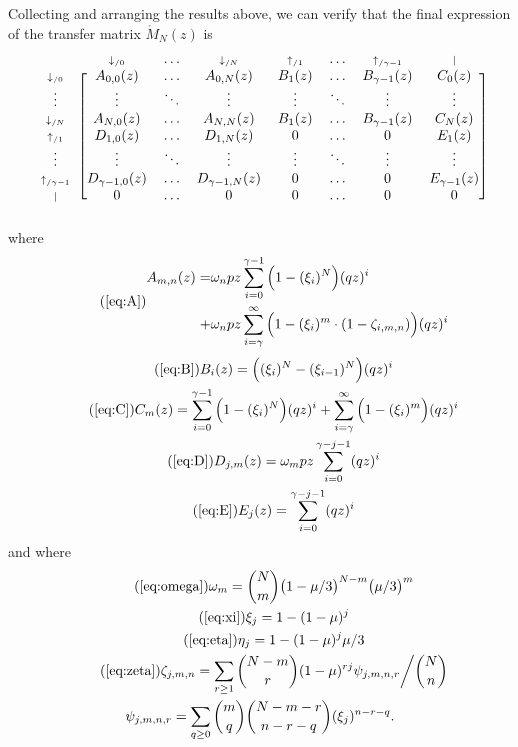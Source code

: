 \documentclass{article}
\newcommand{\dn}[1]{\scriptstyle{\downarrow_{/#1}}}
\newcommand{\up}[1]{\scriptstyle{\uparrow_{/#1}}}
\newcommand{\nd}{\scriptstyle{|}}
\begin{document}
Collecting and arranging the results above, we can verify that the final
expression of the transfer matrix $\mathring{M}_N(z)$ is
\begin{equation*}
\begin{blockarray}{cccccccc}
   & \dn{0} & \ldots & \dn{N} & \up{1} & \ldots & \up{\gamma-1} & \nd \\
\begin{block}{c[ccccccc]}
\dn{0} & A_{0,0}(z) & \ldots & A_{0,N}(z) & B_1(z) & \ldots &
    B_{\gamma-1}(z) & C_0(z) \\
\vdots & \vdots & \ddots & \vdots & \vdots & \ddots &
    \vdots & \vdots \\
\dn{N} & A_{N,0}(z) & \ldots & A_{N,N}(z) & B_1(z) & \ldots &
    B_{\gamma-1}(z) & C_N(z) \\
\up{1} & D_{1,0}(z) & \ldots & D_{1,N}(z) & 0 & \ldots & 0 & E_1(z) \\
\vdots & \vdots & \ddots & \vdots & \vdots & \ddots &
    \vdots & \vdots \\
\up{\gamma-1} & D_{\gamma-1,0}(z) & \ldots & D_{\gamma-1,N}(z) & 0 &
  \ldots & 0 & E_{\gamma-1}(z) \\
\nd & 0 & \ldots & 0 & 0 & \ldots & 0 & 0 \\
\end{block}
\end{blockarray}
\end{equation*}
where
\begin{equation}
\tag{\ref{eq:A}}
\begin{split}
A_{m,n}(z) =
&\omega_n pz \sum_{i=0}^{\gamma-1} \Big(1 - (\xi_i)^N \Big) (qz)^i \\
+ &\omega_n pz \sum_{i=\gamma}^\infty \Big(1 - (\xi_i)^m \cdot
(1- \zeta_{i,m,n}) \Big) (qz)^i 
\end{split}
\end{equation}
\begin{gather}
\tag{\ref{eq:B}}
B_i(z) = \Big( (\xi_i)^N-(\xi_{i-1})^N \Big) (qz)^i \\
\tag{\ref{eq:C}}
C_m(z) =
\sum_{i=0}^{\gamma-1} \Big(1 - (\xi_i)^N \Big) (qz)^i +
  \sum_{i=\gamma}^\infty \Big(1 - (\xi_i)^m \Big) (qz)^i \\
\tag{\ref{eq:D}}
D_{j,m}(z) = \omega_m pz \sum_{i=0}^{\gamma-j-1} (qz)^i \\
\tag{\ref{eq:E}}
E_j(z) = \sum_{i=0}^{\gamma-j-1} (qz)^i
\end{gather}
and where
\begin{gather}
\tag{\ref{eq:omega}}
\omega_m = {N \choose m} \big(1 - \mu/3\big)^{N-m} \big(\mu/3\big)^m \\
\tag{\ref{eq:xi}}
\xi_j = 1-(1-\mu)^j \\
\tag{\ref{eq:eta}}
\eta_j = 1-(1-\mu)^j\mu/3 \\
\tag{\ref{eq:zeta}}
\zeta_{j,m,n} = \sum_{r\geq1} {N-m \choose r}
(1-\mu)^{rj} \psi_{j,m,n,r} \bigg/ {N \choose n} \\
\notag
\psi_{j,m,n,r} = \sum_{q \geq 0}{m \choose q}{N-m-r \choose n-r-q}
(\xi_j)^{n-r-q}.
\end{gather}
\end{document}
